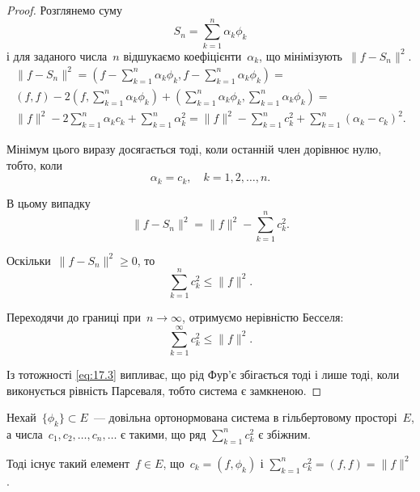 \begin{proof}
Розглянемо суму
\begin{equation*}
    S_n = \sum_{k = 1}^n \alpha_k \phi_k
\end{equation*}
і для заданого числа~$n$ відшукаємо коефіцієнти~$\alpha_k$, що
мінімізують~$\|f - S_n\|^2$.
\begin{multline*}
    \|f - S_n\|^2 =
    \left( f - \sum_{k = 1}^n \alpha_k \phi_k, f - \sum_{k = 1}^n \alpha_k \phi_k \right) = \\
    (f, f) - 2 \left( f, \sum_{k = 1}^n \alpha_k \phi_k \right) + \left( \sum_{k = 1}^n \alpha_k \phi_k, \sum_{k = 1}^n \alpha_k \phi_k \right) = \\
    \|f\|^2 - 2 \sum_{k = 1}^n \alpha_k c_k + \sum_{k = 1}^n \alpha_k^2 =
    \|f\|^2 - \sum_{k = 1}^n c_k^2 + \sum_{k = 1}^n (\alpha_k - c_k)^2.
\end{multline*}

Мінімум цього виразу досягається тоді, коли останній член
дорівнює нулю, тобто, коли
\begin{equation*}
    \alpha_k = c_k, \quad k = 1, 2, \dots, n.
\end{equation*}

В цьому випадку
\begin{equation}
    \label{eq:17.3}
    \|f - S_n\|^2 = \|f\|^2 - \sum_{k = 1}^n c_k^2.
\end{equation}

Оскільки~$\|f - S_n\|^2 \ge 0$, то
\begin{equation*}
    \sum_{k = 1}^n c_k^2 \le \|f\|^2.
\end{equation*}

Переходячи до границі при~$n \to \infty$, отримуємо нерівністю
Бесселя:
\begin{equation*}
    \sum_{k = 1}^\infty c_k^2 \le \|f\|^2.
\end{equation*}

Із тотожності \eqref{eq:17.3} випливає, що рід Фур’є збігається тоді і
лише тоді, коли виконується рівність Парсеваля, тобто
система є замкненою. 
\end{proof}

\begin{theorem}
 Нехай~$\{\phi_k\} \subset E$~--- довільна
ортонормована система в гільбертовому просторі~$E$, а
числа~$c_1, c_2, \dots, c_n, \dots$ є такими, що ряд
$\sum_{k = 1}^n c_k^2$ є збіжним.

Тоді існує такий елемент~$f \in E$, що~$c_k = (f, \phi_k)$ і
$\sum_{k = 1}^n c_k^2 = (f, f) = \|f\|^2$.
\end{theorem}

